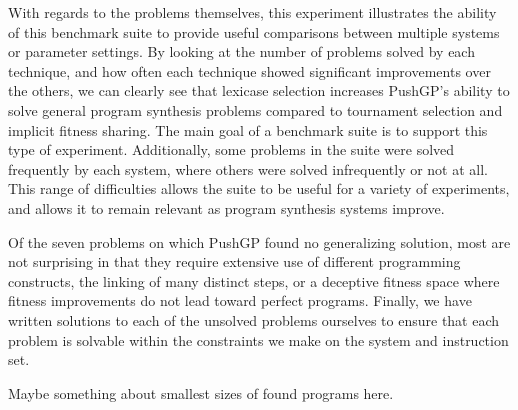 \documentclass{sig-alternate}
\begin{document}
%

With regards to the problems themselves, this experiment illustrates the ability of this benchmark suite to provide useful comparisons between multiple systems or parameter settings. By looking at the number of problems solved by each technique, and how often each technique showed significant improvements over the others, we can clearly see that lexicase selection increases PushGP's ability to solve general program synthesis problems compared to tournament selection and implicit fitness sharing. The main goal of a benchmark suite is to support this type of experiment. Additionally, some problems in the suite were solved frequently by each system, where others were solved infrequently or not at all. This range of difficulties allows the suite to be useful for a variety of experiments, and allows it to remain relevant as program synthesis systems improve.

Of the seven problems on which PushGP found no generalizing solution, most are not surprising in that they require extensive use of different programming constructs, the linking of many distinct steps, or a deceptive fitness space where fitness improvements do not lead toward perfect programs. 
Finally, we have written solutions to each of the unsolved problems ourselves to ensure that each problem is solvable within the constraints we make on the system and instruction set.


Maybe something about smallest sizes of found programs here.

\end{document}

